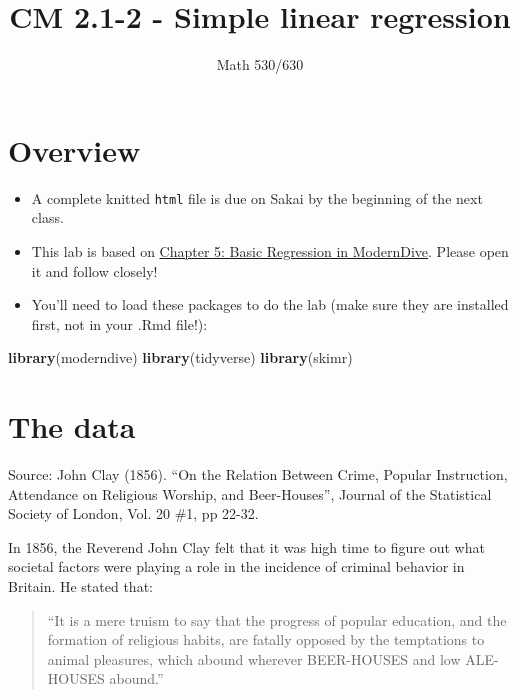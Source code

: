 \documentclass[]{article}
\title{CM 2.1-2 - Simple linear regression}
\subtitle{Math 530/630}
\author{}
\date{}
\newenvironment{Shaded}{\begin{snugshade}}{\end{snugshade}}
\newcommand{\KeywordTok}[1]{\textcolor[rgb]{0.13,0.29,0.53}{\textbf{#1}}}
\newcommand{\NormalTok}[1]{#1}
\providecommand{\tightlist}{%
  \setlength{\itemsep}{0pt}\setlength{\parskip}{0pt}}
\begin{document}
\maketitle

{
\setcounter{tocdepth}{2}
\tableofcontents
}
\hypertarget{overview}{%
\section{Overview}\label{overview}}

\begin{itemize}
\tightlist
\item
  A complete knitted \texttt{html} file is due on Sakai by the beginning
  of the next class.
\item
  This lab is based on
  \href{https://moderndive.com/5-regression.html}{Chapter 5: Basic
  Regression in ModernDive}. Please open it and follow closely!
\item
  You'll need to load these packages to do the lab (make sure they are
  installed first, not in your .Rmd file!):
\end{itemize}

\begin{Shaded}
\begin{Highlighting}[]
\KeywordTok{library}\NormalTok{(moderndive)}
\KeywordTok{library}\NormalTok{(tidyverse)}
\KeywordTok{library}\NormalTok{(skimr)}
\end{Highlighting}
\end{Shaded}

\hypertarget{the-data}{%
\section{The data}\label{the-data}}

Source: John Clay (1856). ``On the Relation Between Crime, Popular
Instruction, Attendance on Religious Worship, and Beer-Houses'', Journal
of the Statistical Society of London, Vol. 20 \#1, pp 22-32.

In 1856, the Reverend John Clay felt that it was high time to figure out
what societal factors were playing a role in the incidence of criminal
behavior in Britain. He stated that:

\begin{quote}
``It is a mere truism to say that the progress of popular education, and
the formation of religious habits, are fatally opposed by the
temptations to animal pleasures, which abound wherever BEER-HOUSES and
low ALE-HOUSES abound.''
\end{quote}
\end{document}
